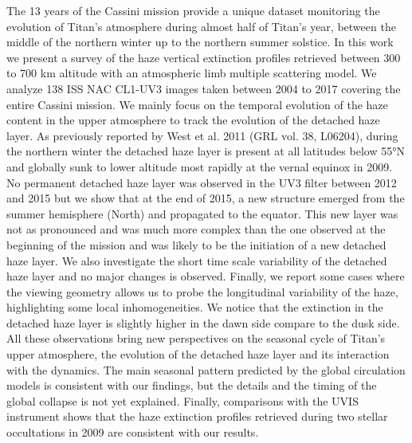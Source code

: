 The 13 years of the Cassini mission provide a unique dataset monitoring
the evolution of Titan’s atmosphere during almost half of Titan's year,
between the middle of the northern winter up to the northern summer solstice.
In this work we present a survey of the haze vertical extinction profiles retrieved
between 300 to 700 km altitude with an atmospheric limb multiple scattering model.
We analyze 138 ISS NAC CL1-UV3 images taken between 2004 to 2017 covering the
entire Cassini mission.
We mainly focus on the temporal evolution of the haze content
in the upper atmosphere to track the evolution of the detached haze layer.
As previously reported by West et al. 2011 (GRL vol. 38, L06204),
during the northern winter the detached haze layer is present
at all latitudes below \ang{55}N and globally sunk to lower altitude
most rapidly at the vernal equinox in 2009.
No permanent detached haze layer was observed in the UV3 filter between 2012 and 2015 but
we show that at the end of 2015, a new structure emerged from
the summer hemisphere (North) and propagated to the equator. This new layer
was not as pronounced and was much more complex than the one observed at the
beginning of the mission and was likely to be the initiation of a new detached haze layer.
We also investigate the short time scale variability of the detached haze
layer and no major changes is observed. Finally, we report some cases
where the viewing geometry allows us to probe the longitudinal variability
of the haze, highlighting some local inhomogeneities.
We notice that the extinction in the detached haze layer is slightly higher in the dawn
side compare to the dusk side.
All these observations bring new perspectives
on the seasonal cycle of Titan's upper atmosphere, the evolution of the detached
haze layer and its interaction with the dynamics.
The main seasonal pattern predicted by the global circulation models is consistent
with our findings, but the details and the timing of the global collapse
is not yet explained. Finally, comparisons with the UVIS instrument shows
that the haze extinction profiles retrieved during two stellar occultations
in 2009 are consistent with our results.